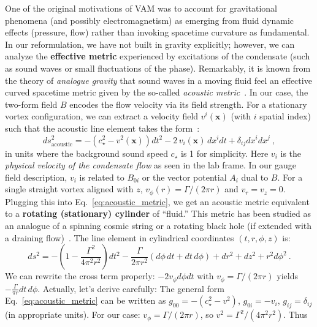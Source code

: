 \documentclass[12pt]{article}
\begin{document}
One of the original motivations of VAM was to account for gravitational phenomena (and possibly electromagnetism) as emerging from fluid dynamic effects (pressure, flow) rather than invoking spacetime curvature as fundamental. In our reformulation, we have not built in gravity explicitly; however, we can analyze the \textbf{effective metric} experienced by excitations of the condensate (such as sound waves or small fluctuations of the phase). Remarkably, it is known from the theory of \textit{analogue gravity} that sound waves in a moving fluid feel an effective curved spacetime metric given by the so-called \textit{acoustic metric}~\cite{ref:unruh}. In our case, the two-form field $B$ encodes the flow velocity via its field strength. For a stationary vortex configuration, we can extract a velocity field $v^i(\mathbf{x})$ (with $i$ spatial index) such that the acoustic line element takes the form~\cite{ref:visser}:
\begin{equation}
    ds^2_{\text{acoustic}} = -\left(c_\star^2 - v^2(\mathbf{x})\right)dt^2 - 2\, v_i(\mathbf{x})\, dx^i dt + \delta_{ij} dx^i dx^j~,
    \label{eq:acoustic_metric}
\end{equation}
in units where the background sound speed $c_\star$ is 1 for simplicity. Here $v_i$ is the \textit{physical velocity of the condensate flow} as seen in the lab frame. In our gauge field description, $v_i$ is related to $B_{0i}$ or the vector potential $A_i$ dual to $B$. For a single straight vortex aligned with $z$, $v_\phi(r) = \Gamma/(2\pi r)$ and $v_r = v_z = 0$. Plugging this into Eq.~\eqref{eq:acoustic_metric}, we get an acoustic metric equivalent to a \textbf{rotating (stationary) cylinder} of ``fluid.'' This metric has been studied as an analogue of a spinning cosmic string or a rotating black hole (if extended with a draining flow)~\cite{ref:visser_string}. The line element in cylindrical coordinates $(t,r,\phi,z)$ is:
\begin{equation}
    ds^2 = -\left(1 - \frac{\Gamma^2}{4\pi^2 r^2}\right)dt^2 - \frac{\Gamma}{2\pi r^2}(d\phi\, dt + dt\, d\phi) + dr^2 + dz^2 + r^2 d\phi^2~.
    \label{eq:vortex_metric}
\end{equation}
We can rewrite the cross term properly: $-2v_\phi d\phi dt$ with $v_\phi = \Gamma/(2\pi r)$ yields $-\frac{\Gamma}{\pi r} dt\, d\phi$. Actually, let’s derive carefully: The general form Eq.~\eqref{eq:acoustic_metric} can be written as $g_{00} = -(c_\star^2 - v^2)$, $g_{0i} = -v_i$, $g_{ij} = \delta_{ij}$ (in appropriate units). For our case: $v_\phi = \Gamma/(2\pi r)$, so $v^2 = \Gamma^2/(4\pi^2 r^2)$. Thus
\end{document}
